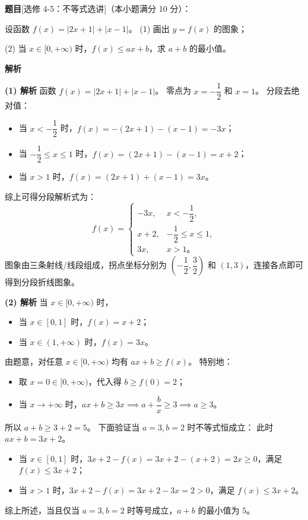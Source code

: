 \begin{answer}

\textbf{题目}[选修 4-5：不等式选讲]（本小题满分 10 分）：

设函数 $f(x) = |2x + 1| + |x - 1|$。
(1) 画出 $y = f(x)$ 的图象；
\nopagebreak[4]
\begin{center}\end{center}
\nopagebreak[4]
(2) 当 $x \in [0, +\infty)$ 时，$f(x) \leqslant ax + b$，求 $a + b$ 的最小值。

\textbf{解析}

\textbf{(1) 解析} 函数 $f(x) = |2x + 1| + |x - 1|$。
零点为 $x = -\dfrac12$ 和 $x = 1$。
分段去绝对值：
\begin{itemize}
\item 当 $x < -\dfrac12$ 时，$f(x) = -(2x + 1) - (x - 1) = -3x$；
\item 当 $-\dfrac12 \leqslant x \leqslant 1$ 时，$f(x) = (2x + 1) - (x - 1) = x + 2$；
\item 当 $x > 1$ 时，$f(x) = (2x + 1) + (x - 1) = 3x$。
\end{itemize}
综上可得分段解析式为：
\nopagebreak[4]
\[f(x) = \begin{cases} -3x, & x < -\dfrac12, \\ x + 2, & -\dfrac12 \leqslant x \leqslant 1, \\ 3x, & x > 1\mbox{。} \end{cases}\]
图象由三条射线/线段组成，拐点坐标分别为 $\left(-\dfrac12, \dfrac32\right)$ 和 $(1, 3)$，连接各点即可得到分段折线图象。

\textbf{(2) 解析} 当 $x \in [0, +\infty)$ 时，
\begin{itemize}
\item 当 $x \in [0, 1]$ 时，$f(x) = x + 2$；
\item 当 $x \in (1, +\infty)$ 时，$f(x) = 3x$。
\end{itemize}
由题意，对任意 $x \in [0, +\infty)$ 均有 $ax + b \geqslant f(x)$。
特别地：
\begin{itemize}
\item 取 $x = 0 \in [0, +\infty)$，代入得 $b \geqslant f(0) = 2$；
\item 当 $x \to +\infty$ 时，$ax + b \geqslant 3x \implies a + \dfrac{b}{x} \geqslant 3 \implies a \geqslant 3$。
\end{itemize}
所以 $a + b \geqslant 3 + 2 = 5$。
下面验证当 $a = 3, b = 2$ 时不等式恒成立：
此时 $ax + b = 3x + 2$。
\begin{itemize}
\item 当 $x \in [0, 1]$ 时，$3x + 2 - f(x) = 3x + 2 - (x + 2) = 2x \geqslant 0$，满足 $f(x) \leqslant 3x + 2$；
\item 当 $x > 1$ 时，$3x + 2 - f(x) = 3x + 2 - 3x = 2 > 0$，满足 $f(x) \leqslant 3x + 2$。
\end{itemize}
综上所述，当且仅当 $a = 3, b = 2$ 时等号成立，$a + b$ 的最小值为 $5$。


\end{answer}
